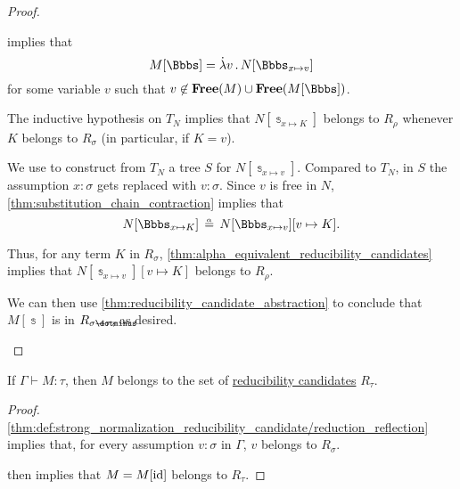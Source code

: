 \begin{proof}
\begin{itemize}
     implies that
    \begin{equation*}
      M[\Bbbs] = \qabs v N[\Bbbs_{x \mapsto v}]
    \end{equation*}
    for some variable \( v \) such that \( v \not\in \op*{Free}(M) \cup \op*{Free}(M[\Bbbs]) \).

    The inductive hypothesis on \( T_N \) implies that \( N[\Bbbs_{x \mapsto K}] \) belongs to \( R_\rho \) whenever \( K \) belongs to \( R_\sigma \) (in particular, if \( K = v \)).

    We use  to construct from \( T_N \) a tree \( S \) for \( N[\Bbbs_{x \mapsto v}] \). Compared to \( T_N \), in \( S \) the assumption \( x: \sigma \) gets replaced with \( v: \sigma \). Since \( v \) is free in \( N \), \cref{thm:substitution_chain_contraction} implies that
    \begin{equation*}
      N[\Bbbs_{x \mapsto K}] \aequiv N[\Bbbs_{x \mapsto v}][v \mapsto K].
    \end{equation*}

    Thus, for any term \( K \) in \( R_\sigma \), \cref{thm:alpha_equivalent_reducibility_candidates} implies that \( N[\Bbbs_{x \mapsto v}][v \mapsto K] \) belongs to \( R_\rho \).

    We can then use \cref{thm:reducibility_candidate_abstraction} to conclude that \( M[\Bbbs] \) is in \( R_{\sigma \synimplies \tau} \), as desired.
  \end{itemize}
\end{proof}

\begin{proposition}\label{thm:reducibility_candidate_adequacy}
  If \( \Gamma \vdash M: \tau \), then \( M \) belongs to the set of \hyperref[thm:def:strong_normalization_reducibility_candidate]{reducibility candidates} \( R_\tau \).
\end{proposition}
\begin{proof}
  \ref{thm:def:strong_normalization_reducibility_candidate/reduction_reflection} implies that, for every assumption \( v: \sigma \) in \( \Gamma \), \( v \) belongs to \( R_\sigma \).

   then implies that \( M = M[\operatorname{id}] \) belongs to \( R_\tau \).
\end{proof}

